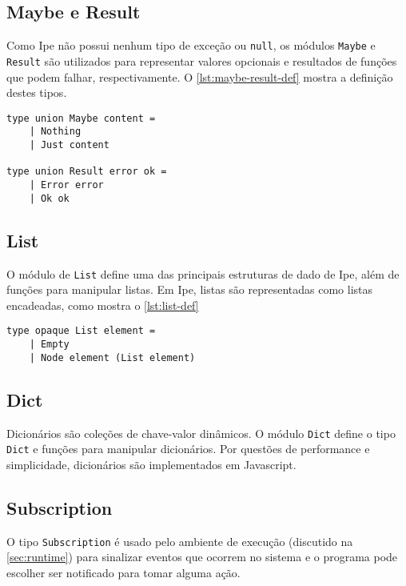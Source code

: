\subsection{Maybe e Result}

Como Ipe não possui nenhum tipo de exceção ou \texttt{null}, os módulos \texttt{Maybe}
e \texttt{Result} são utilizados para representar valores opcionais e resultados
de funções que podem falhar, respectivamente. O \autoref{lst:maybe-result-def}
mostra a definição destes tipos.

\begin{lstlisting}[label={lst:maybe-result-def},caption={Definição de \texttt{Maybe} e \texttt{Result}}]
type union Maybe content =
    | Nothing
    | Just content

type union Result error ok =
    | Error error
    | Ok ok
\end{lstlisting}


\subsection{List}

O módulo de \texttt{List} define uma das principais estruturas de dado de Ipe,
além de funções para manipular listas. Em Ipe, listas são representadas como
listas encadeadas, como mostra o \autoref{lst:list-def}

\begin{lstlisting}[label={lst:list-def},caption={Definição de listas em Ipe}]
type opaque List element =
    | Empty
    | Node element (List element)
\end{lstlisting}

\subsection{Dict}

Dicionários são coleções de chave-valor dinâmicos. O módulo \texttt{Dict} define
o tipo \texttt{Dict} e funções para manipular dicionários. Por questões de performance
e simplicidade, dicionários são implementados em Javascript.

\subsection{Subscription}

O tipo \texttt{Subscription} é usado pelo ambiente de execução (discutido na
\autoref{sec:runtime}) para sinalizar eventos que ocorrem no sistema e o programa
pode escolher ser notificado para tomar alguma ação.

